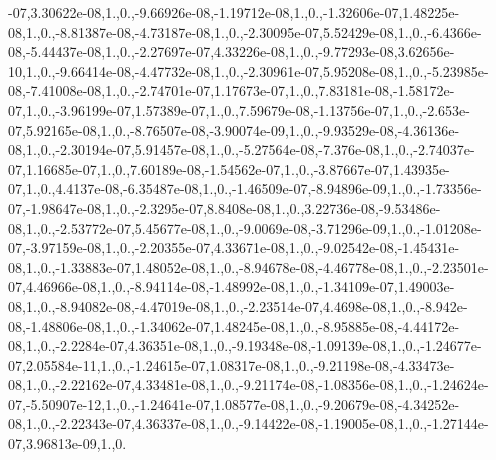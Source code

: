 {-\/07,3.\-30622e-\/08,1.,0.,-\/9.\-66926e-\/08,-\/1.\-19712e-\/08,1.,0.,-\/1.\-32606e-\/07,1.\-48225e-\/08,1.,0.,-\/8.\-81387e-\/08,-\/4.\-73187e-\/08,1.,0.,-\/2.\-30095e-\/07,5.\-52429e-\/08,1.,0.,-\/6.\-4366e-\/08,-\/5.\-44437e-\/08,1.,0.,-\/2.\-27697e-\/07,4.\-33226e-\/08,1.,0.,-\/9.\-77293e-\/08,3.\-62656e-\/10,1.,0.,-\/9.\-66414e-\/08,-\/4.\-47732e-\/08,1.,0.,-\/2.\-30961e-\/07,5.\-95208e-\/08,1.,0.,-\/5.\-23985e-\/08,-\/7.\-41008e-\/08,1.,0.,-\/2.\-74701e-\/07,1.\-17673e-\/07,1.,0.,7.\-83181e-\/08,-\/1.\-58172e-\/07,1.,0.,-\/3.\-96199e-\/07,1.\-57389e-\/07,1.,0.,7.\-59679e-\/08,-\/1.\-13756e-\/07,1.,0.,-\/2.\-653e-\/07,5.\-92165e-\/08,1.,0.,-\/8.\-76507e-\/08,-\/3.\-90074e-\/09,1.,0.,-\/9.\-93529e-\/08,-\/4.\-36136e-\/08,1.,0.,-\/2.\-30194e-\/07,5.\-91457e-\/08,1.,0.,-\/5.\-27564e-\/08,-\/7.\-376e-\/08,1.,0.,-\/2.\-74037e-\/07,1.\-16685e-\/07,1.,0.,7.\-60189e-\/08,-\/1.\-54562e-\/07,1.,0.,-\/3.\-87667e-\/07,1.\-43935e-\/07,1.,0.,4.\-4137e-\/08,-\/6.\-35487e-\/08,1.,0.,-\/1.\-46509e-\/07,-\/8.\-94896e-\/09,1.,0.,-\/1.\-73356e-\/07,-\/1.\-98647e-\/08,1.,0.,-\/2.\-3295e-\/07,8.\-8408e-\/08,1.,0.,3.\-22736e-\/08,-\/9.\-53486e-\/08,1.,0.,-\/2.\-53772e-\/07,5.\-45677e-\/08,1.,0.,-\/9.\-0069e-\/08,-\/3.\-71296e-\/09,1.,0.,-\/1.\-01208e-\/07,-\/3.\-97159e-\/08,1.,0.,-\/2.\-20355e-\/07,4.\-33671e-\/08,1.,0.,-\/9.\-02542e-\/08,-\/1.\-45431e-\/08,1.,0.,-\/1.\-33883e-\/07,1.\-48052e-\/08,1.,0.,-\/8.\-94678e-\/08,-\/4.\-46778e-\/08,1.,0.,-\/2.\-23501e-\/07,4.\-46966e-\/08,1.,0.,-\/8.\-94114e-\/08,-\/1.\-48992e-\/08,1.,0.,-\/1.\-34109e-\/07,1.\-49003e-\/08,1.,0.,-\/8.\-94082e-\/08,-\/4.\-47019e-\/08,1.,0.,-\/2.\-23514e-\/07,4.\-4698e-\/08,1.,0.,-\/8.\-942e-\/08,-\/1.\-48806e-\/08,1.,0.,-\/1.\-34062e-\/07,1.\-48245e-\/08,1.,0.,-\/8.\-95885e-\/08,-\/4.\-44172e-\/08,1.,0.,-\/2.\-2284e-\/07,4.\-36351e-\/08,1.,0.,-\/9.\-19348e-\/08,-\/1.\-09139e-\/08,1.,0.,-\/1.\-24677e-\/07,2.\-05584e-\/11,1.,0.,-\/1.\-24615e-\/07,1.\-08317e-\/08,1.,0.,-\/9.\-21198e-\/08,-\/4.\-33473e-\/08,1.,0.,-\/2.\-22162e-\/07,4.\-33481e-\/08,1.,0.,-\/9.\-21174e-\/08,-\/1.\-08356e-\/08,1.,0.,-\/1.\-24624e-\/07,-\/5.\-50907e-\/12,1.,0.,-\/1.\-24641e-\/07,1.\-08577e-\/08,1.,0.,-\/9.\-20679e-\/08,-\/4.\-34252e-\/08,1.,0.,-\/2.\-22343e-\/07,4.\-36337e-\/08,1.,0.,-\/9.\-14422e-\/08,-\/1.\-19005e-\/08,1.,0.,-\/1.\-27144e-\/07,3.\-96813e-\/09,1.,0.}
